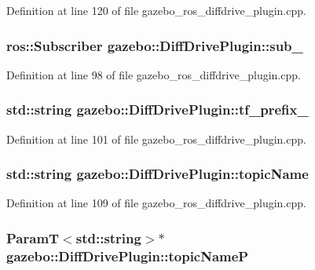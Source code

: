 Definition at line 120 of file gazebo\_\-ros\_\-diffdrive\_\-plugin.cpp.

\subsubsection[{sub\_\-}]{\setlength{\rightskip}{0pt plus 5cm}ros::Subscriber {\bf gazebo::DiffDrivePlugin::sub\_\-}\hspace{0.3cm}{\ttfamily  [private]}}\label{classgazebo_1_1DiffDrivePlugin_a1733f2eaaf4e30d1bc20a907557abb47}


Definition at line 98 of file gazebo\_\-ros\_\-diffdrive\_\-plugin.cpp.

\subsubsection[{tf\_\-prefix\_\-}]{\setlength{\rightskip}{0pt plus 5cm}std::string {\bf gazebo::DiffDrivePlugin::tf\_\-prefix\_\-}\hspace{0.3cm}{\ttfamily  [private]}}\label{classgazebo_1_1DiffDrivePlugin_ad0a1d144c0fab4422de673b6ea1a52bc}


Definition at line 101 of file gazebo\_\-ros\_\-diffdrive\_\-plugin.cpp.

\subsubsection[{topicName}]{\setlength{\rightskip}{0pt plus 5cm}std::string {\bf gazebo::DiffDrivePlugin::topicName}\hspace{0.3cm}{\ttfamily  [private]}}\label{classgazebo_1_1DiffDrivePlugin_a7a363d7177ff094979ca9c6b801acc9b}


Definition at line 109 of file gazebo\_\-ros\_\-diffdrive\_\-plugin.cpp.

\subsubsection[{topicNameP}]{\setlength{\rightskip}{0pt plus 5cm}ParamT$<$std::string$>$$\ast$ {\bf gazebo::DiffDrivePlugin::topicNameP}\hspace{0.3cm}{\ttfamily  [private]}}\label{classgazebo_1_1DiffDrivePlugin_aa75ec8e40922cc2a572f2344c163cab1}


